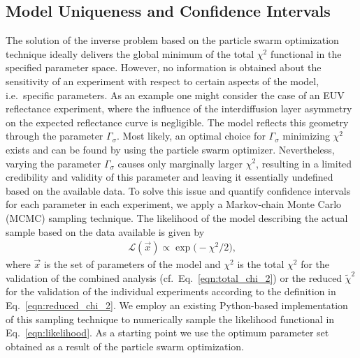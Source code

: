 \subsection{Model Uniqueness and Confidence Intervals}
The solution of the inverse problem based on the particle swarm optimization 
technique ideally delivers the global minimum of the total $\chi^2$ functional 
in the specified parameter space. However, no information is obtained about the 
sensitivity of an experiment with respect to certain aspects of the model, 
i.e.~specific parameters. As an example one might consider the case of an EUV 
reflectance experiment, where the influence of the interdiffusion layer 
asymmetry on the expected reflectance curve is negligible. The model reflects 
this geometry through the parameter $\Gamma_\sigma$. Most likely, an optimal 
choice for $\Gamma_\sigma$ minimizing $\chi^2$ exists and can be found by using 
the particle swarm optimizer. Nevertheless, varying the parameter 
$\Gamma_\sigma$ causes only marginally larger $\chi^2$, resulting in a limited 
credibility and validity of this parameter and leaving it essentially undefined 
based on the available data. To solve this issue and quantify confidence 
intervals for each parameter in each experiment, we apply a Markov-chain Monte 
Carlo (MCMC) sampling technique. The likelihood of the model describing the 
actual sample based on the data available is given by
\begin{align}
\mathcal{L}(\vec{x}) \propto \exp \big(-\chi^2 / 2 \big) \text{,} 
\label{eqn:likelihood}
\end{align}
where $\vec{x}$ is the set of parameters of the model and $\chi^2$ is the total 
$\chi^2$ for the validation of the combined analysis 
(cf.~Eq.~\eqref{eqn:total_chi_2}) or the reduced $\tilde{\chi}^2$ for the 
validation of the individual experiments according to the definition in 
Eq.~\eqref{eqn:reduced_chi_2}.
We employ an existing Python-based implementation of this sampling technique 
\cite{foreman-mackey_emcee:_2013} to numerically sample the likelihood functional in 
Eq.~\eqref{eqn:likelihood}. As a starting point we use the optimum parameter 
set obtained as a result of the particle swarm optimization.

